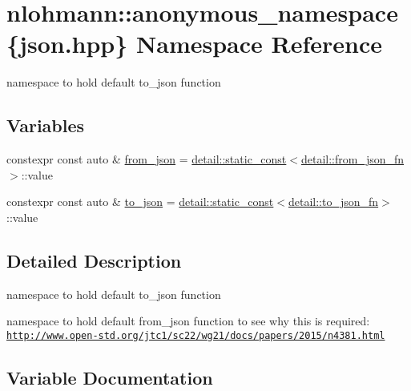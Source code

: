 \hypertarget{namespacenlohmann_1_1anonymous__namespace_02json_8hpp_03}{}\section{nlohmann\+:\+:anonymous\+\_\+namespace\{json.\+hpp\} Namespace Reference}
\label{namespacenlohmann_1_1anonymous__namespace_02json_8hpp_03}


namespace to hold default {\ttfamily to\+\_\+json} function  


\subsection*{Variables}
\begin{DoxyCompactItemize}
\item 
constexpr const auto \& \hyperlink{namespacenlohmann_1_1anonymous__namespace_02json_8hpp_03_a69afe041fa2aeac2239b65ae88b64af8}{from\+\_\+json} = \hyperlink{structnlohmann_1_1detail_1_1static__const}{detail\+::static\+\_\+const}$<$\hyperlink{structnlohmann_1_1detail_1_1from__json__fn}{detail\+::from\+\_\+json\+\_\+fn}$>$\+::value
\item 
constexpr const auto \& \hyperlink{namespacenlohmann_1_1anonymous__namespace_02json_8hpp_03_a455d0daa616e67bbb74d81cf3ba15e79}{to\+\_\+json} = \hyperlink{structnlohmann_1_1detail_1_1static__const}{detail\+::static\+\_\+const}$<$\hyperlink{structnlohmann_1_1detail_1_1to__json__fn}{detail\+::to\+\_\+json\+\_\+fn}$>$\+::value
\end{DoxyCompactItemize}


\subsection{Detailed Description}
namespace to hold default {\ttfamily to\+\_\+json} function 

namespace to hold default {\ttfamily from\+\_\+json} function to see why this is required\+: \href{http://www.open-std.org/jtc1/sc22/wg21/docs/papers/2015/n4381.html}{\tt http\+://www.\+open-\/std.\+org/jtc1/sc22/wg21/docs/papers/2015/n4381.\+html} 

\subsection{Variable Documentation}
\mbox{\label{namespacenlohmann_1_1anonymous__namespace_02json_8hpp_03_a69afe041fa2aeac2239b65ae88b64af8}} 
